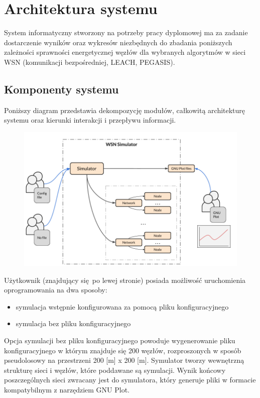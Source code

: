 \documentclass[a4paper,12pt,twoside,openany]{report}
\begin{document}
\chapter{Architektura systemu}

System informatyczny stworzony na potrzeby pracy dyplomowej ma za zadanie dostarczenie wyników oraz wykresów niezbędnych do zbadania poniższych zależności sprawności energetycznej 
węzłów dla wybranych algorytmów w sieci WSN (komunikacji bezpośredniej, LEACH, PEGASIS). 

\section{Komponenty systemu}

Poniższy diagram przedstawia dekompozycję modułów, całkowitą architekturę systemu oraz kierunki interakcji i przepływu informacji.

\begin{figure}[H]
 \centering
 \includegraphics[width=13cm]{images/architektura_systemu.png} 
\end{figure}

Użytkownik (znajdujący się po lewej stronie) posiada możliwość uruchomienia oprogramowania na dwa sposoby: 

\begin{itemize}
 \item symulacja wstępnie konfigurowana za pomocą pliku konfiguracyjnego
 \item symulacja bez pliku konfiguracyjnego
\end{itemize}

Opcja symulacji bez pliku konfiguracyjnego powoduje wygenerowanie pliku konfiguracyjnego w którym znajduje się 200 węzłów, rozproszonych w sposób
pseudolosowy na przestrzeni 200 [m] x 200 [m].
Symulator tworzy wewnętrzną strukturę sieci i węzłów, które poddawane są symulacji. Wynik końcowy poszczególnych sieci zwracany jest do symulatora, który
generuje pliki w formacie kompatybilnym z narzędziem GNU Plot. 
\end{document}
